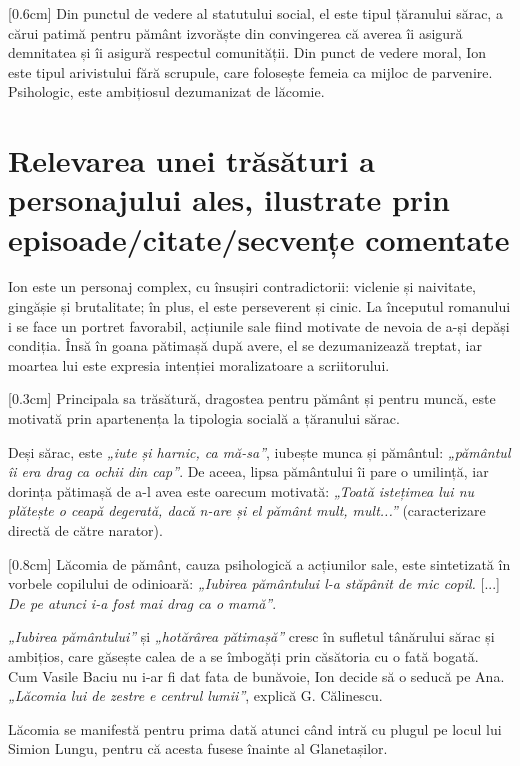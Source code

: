 [0.6cm]
Din punctul de vedere al statutului social, el este tipul țăranului sărac, a cărui patimă pentru pământ izvorăște din convingerea  că averea îi asigură demnitatea și îi asigură respectul comunității. Din punct de vedere moral, Ion este tipul arivistului fără scrupule, care folosește femeia ca mijloc de parvenire. Psihologic, este ambițiosul dezumanizat de lăcomie.


\section{Relevarea unei trăsături a personajului ales, ilustrate prin episoade/citate/secvențe comentate}

Ion este un personaj complex, cu însușiri contradictorii: viclenie și naivitate, gingășie și brutalitate; în plus, el este perseverent și cinic. La începutul romanului i se face un portret favorabil, acțiunile sale fiind motivate de nevoia de a-și depăși condiția. Însă în goana pătimașă după avere, el se dezumanizează treptat, iar moartea lui este expresia intenției moralizatoare a scriitorului.

[0.3cm]
Principala sa trăsătură, dragostea pentru pământ și pentru muncă, este motivată prin apartenența la tipologia socială a țăranului sărac.

Deși sărac, este \textit{„iute și harnic, ca mă-sa”}, iubește munca și pământul: \textit{„pământul îi era drag ca ochii din cap”}. De aceea, lipsa pământului îi pare o umilință, iar dorința pătimașă de a-l avea este oarecum motivată: \textit{„Toată istețimea lui nu plătește o ceapă degerată, dacă n-are și el pământ mult, mult...”} (caracterizare directă de către narator).

[0.8cm]
Lăcomia de pământ, cauza psihologică a acțiunilor sale, este sintetizată în vorbele copilului de odinioară: \textit{„Iubirea pământului l-a stăpânit de mic copil.} [...] \textit{De pe atunci i-a fost mai drag ca o mamă”}.

\textit{„Iubirea pământului”} și \textit{„hotărârea pătimașă”} cresc în sufletul tânărului sărac și ambițios, care găsește calea de a se îmbogăți prin căsătoria cu o fată bogată. Cum Vasile Baciu nu i-ar fi dat fata de bunăvoie, Ion decide să o seducă pe Ana. \textit{„Lăcomia lui de zestre e centrul lumii”}, explică G. Călinescu.

Lăcomia se manifestă pentru prima dată atunci când intră cu plugul pe locul lui Simion Lungu, pentru că acesta fusese înainte al Glanetașilor.

